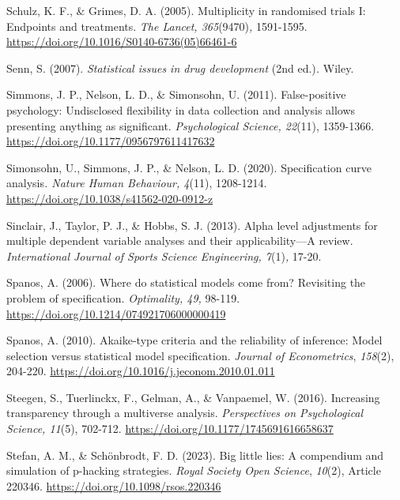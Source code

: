 \documentclass[authordate, meta]{jote-new-article}
\begin{document}
	Schulz, K. F., \& Grimes, D. A. (2005). Multiplicity in randomised trials I: Endpoints and treatments. \emph{The Lancet, 365}(9470)\emph{,} 1591-1595. \url{https://doi.org/10.1016/S0140-6736(05)66461-6}



	Senn, S. (2007). \emph{Statistical issues in drug development }(2nd ed.)\emph{.} Wiley.



	Simmons, J. P., Nelson, L. D., \& Simonsohn, U. (2011). False-positive psychology: Undisclosed flexibility in data collection and analysis allows presenting anything as significant. \emph{Psychological Science, 22}(11), 1359-1366. \url{https://doi.org/10.1177/0956797611417632}



	Simonsohn, U., Simmons, J. P., \& Nelson, L. D. (2020). Specification curve analysis\emph{. Nature Human Behaviour, 4}(11), 1208-1214. \url{https://doi.org/10.1038/s41562-020-0912-z}



	Sinclair, J., Taylor, P. J., \& Hobbs, S. J. (2013). Alpha level adjustments for multiple dependent variable analyses and their applicability—A review. \emph{International Journal of Sports Science Engineering, 7}(1)\emph{,} 17-20.



	Spanos, A. (2006). Where do statistical models come from? Revisiting the problem of specification. \emph{Optimality, 49,} 98-119. \url{https://doi.org/10.1214/074921706000000419}



	Spanos, A. (2010). Akaike-type criteria and the reliability of inference: Model selection versus statistical model specification. \emph{Journal of Econometrics}, \emph{158}(2), 204-220. \url{https://doi.org/10.1016/j.jeconom.2010.01.011}



	Steegen, S., Tuerlinckx, F., Gelman, A., \& Vanpaemel, W. (2016). Increasing transparency through a multiverse analysis. \emph{Perspectives on Psychological Science, 11}(5), 702-712. \url{https://doi.org/10.1177/1745691616658637}



	Stefan, A. M., \& Schönbrodt, F. D. (2023). Big little lies: A compendium and simulation of p-hacking strategies. \emph{Royal Society Open Science}, \emph{10}(2), Article 220346. \url{https://doi.org/10.1098/rsos.220346}
\end{document}
